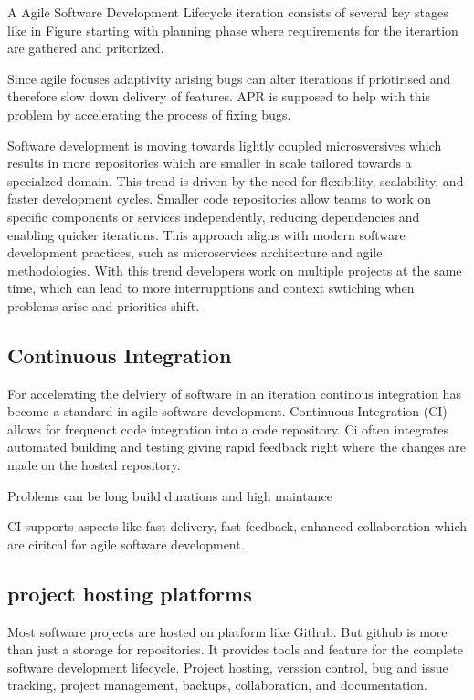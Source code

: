 A Agile Software Development Lifecycle iteration consists of several key stages like in Figure starting with planning phase where requirements for the iterartion are gathered and pritorized.

Since agile focuses adaptivity arising bugs can alter iterations if priotirised and therefore slow down delivery of features. APR is supposed to help with this problem by accelerating the process of fixing bugs.

Software development is moving towards lightly coupled microsversives which results in more repositories which are smaller in scale tailored towards a specialzed domain. This trend is driven by the need for flexibility, scalability, and faster development cycles. Smaller code repositories allow teams to work on specific components or services independently, reducing dependencies and enabling quicker iterations. This approach aligns with modern software development practices, such as microservices architecture and agile methodologies.
With this trend developers work on multiple projects at the same time, which can lead to more interrupptions and context swtiching when problems arise and priorities shift.



\subsection{Continuous Integration}

For accelerating the delviery of software in an iteration continous integration has become a standard in agile software development. 
Continuous Integration (CI) allows for frequenct code integration into a code repository. Ci often integrates automated building and testing giving rapid feedback right where the changes are made on the hosted repository.


Problems can be long build durations and high maintance \cite{ugwuezeContinuousIntegrationDeployment2024}

CI supports aspects like fast delivery, fast feedback, enhanced collaboration which are ciritcal for agile software development. 

\subsection{project hosting platforms}
Most software projects are hosted on platform like Github. But github is more than just a storage for repositories. It provides tools and feature for the complete software development lifecycle. Project hosting, verssion control, bug and issue tracking, project management, backups, collaboration, and documentation. \cite{abrahamssonAgileSoftwareDevelopment2017}




